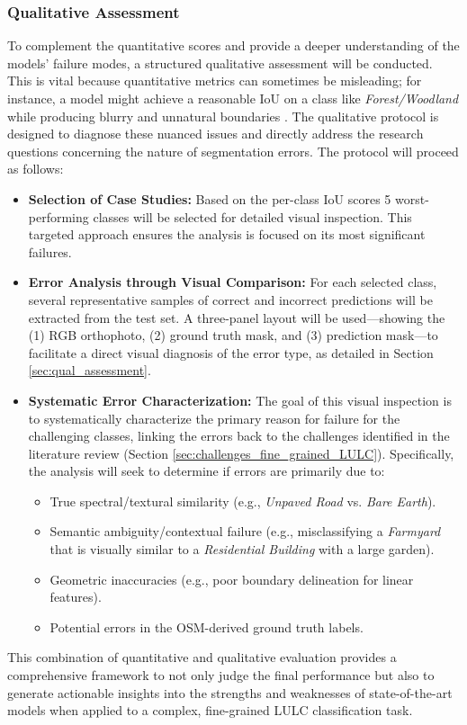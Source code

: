 \documentclass{report}
\begin{document}
\subsubsection{Qualitative Assessment}
To complement the quantitative scores and provide a deeper understanding of the models' failure modes, a structured qualitative assessment will be conducted. This is vital because quantitative metrics can sometimes be misleading; for instance, a model might achieve a reasonable IoU on a class like \textit{Forest/Woodland} while producing blurry and unnatural boundaries \parencite [p.~10.]{KaiserEtAlLearningAerialImageSegmentationOnlineMaps2017}. The qualitative protocol is designed to diagnose these nuanced issues and directly address the research questions concerning the nature of segmentation errors.
The protocol will proceed as follows:
\begin{itemize}
    \item\textbf{Selection of Case Studies:} Based on the per-class IoU scores 5 worst-performing classes will be selected for detailed visual inspection. This targeted approach ensures the analysis is focused on its most significant failures.
    \item\textbf{Error Analysis through Visual Comparison:} For each selected class, several representative samples of correct and incorrect predictions will be extracted from the test set. A three-panel layout will be used—showing the (1) RGB orthophoto, (2) ground truth mask, and (3) prediction mask—to facilitate a direct visual diagnosis of the error type, as detailed in Section \ref{sec:qual_assessment}.
    \item \textbf{Systematic Error Characterization:} The goal of this visual inspection is to systematically characterize the primary reason for failure for the challenging classes, linking the errors back to the challenges identified in the literature review (Section \ref{sec:challenges_fine_grained_LULC}). Specifically, the analysis will seek to determine if errors are primarily due to:
    \begin{itemize}
        \item True spectral/textural similarity (e.g., \textit{Unpaved Road} vs. \textit{Bare Earth}).
        \item Semantic ambiguity/contextual failure (e.g., misclassifying a \textit{Farmyard} that is visually similar to a \textit{Residential Building} with a large garden).
         \item  Geometric inaccuracies (e.g., poor boundary delineation for linear features).
        \item Potential errors in the OSM-derived ground truth labels.
    \end{itemize}    
\end{itemize}
This combination of quantitative and qualitative evaluation provides a comprehensive framework to not only judge the final performance but also to generate actionable insights into the strengths and weaknesses of state-of-the-art models when applied to a complex, fine-grained LULC classification task.
\end{document}
